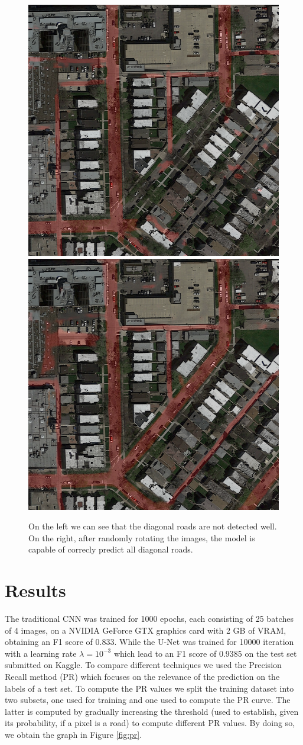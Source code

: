 \documentclass[10pt,conference,compsocconf]{IEEEtran}
\begin{document}
\begin{figure}[h]
 \centering
 \includegraphics[width=0.35\columnwidth]{img/diagonals.png}
 \includegraphics[width=0.35\columnwidth]{img/diagonals_corrected.png}
 \caption{On the left we can see that the diagonal roads are not detected well. On the right, after randomly rotating the images, the model is capable of correcly predict all diagonal roads.}
 \vspace{-3mm}
 \label{fig:diagonal}
\end{figure}

\section{Results}
\label{sec:results}

	The traditional CNN was trained for 1000 epochs, each consisting of 25 batches of 4 images, on a NVIDIA GeForce GTX graphics card with 2 GB of VRAM, obtaining an F1 score of 0.833. While the U-Net was trained for 10000 iteration with a learning rate $\lambda = 10^{-3}$ which lead to an F1 score of 0.9385 on the test set submitted on Kaggle.
	To compare different techniques we used the Precision Recall method (PR) which focuses on the relevance of the prediction on the labels of a test set. To compute the PR values we split the training dataset into two subsets, one used for training and one used to compute the PR curve. The latter is computed by gradually increasing the threshold (used to establish, given its probability, if a pixel is a road) to compute different PR values. By doing so, we obtain the graph in Figure \ref{fig:pr}.
\end{document}
